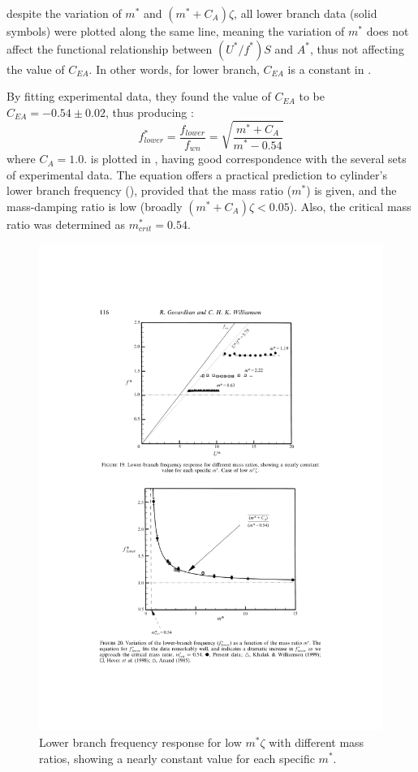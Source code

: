 despite the variation of $m^*$ and $(m^*+C_A)\zeta$, all lower branch data (solid symbols) were plotted along the same line, meaning the variation of $m^*$ does not affect the functional relationship between $(U^*/f^*)S$ and $A^*$, thus not affecting the value of $C_{EA}$. In other words, for lower branch, $C_{EA}$ is a constant in .

By fitting experimental data, they found the value of $C_{EA}$ to be $C_{EA}=-0.54\pm0.02$, thus producing :
\begin{equation}	\label{eq:61}
f^*_{lower}=\frac{f_{lower}}{f_{wn}}=\sqrt{\frac{m^*+C_A}{m^*-0.54}}
\end{equation}
where $C_A=1.0$.  is plotted in , having good correspondence with the several sets of experimental data. The equation offers a practical prediction to cylinder's lower branch frequency (\fslower{}), provided that the mass ratio ($m^*$) is given, and the mass-damping ratio is low (broadly $(m^*+C_A)\zeta < 0.05$). Also, the critical mass ratio was determined as $m^*_{crit}=0.54$.

\begin{figure}
	\centering
	\captionsetup{justification=centering}
	\includegraphics[width=0.7\linewidth]{Figs/ufstart}
	\caption{Lower branch frequency response for low $m^*\zeta$ with different mass ratios, showing a nearly constant value for each specific $m^*$.\cite{GOVARDHAN2000}}
	\label{fig:ufstart}
\end{figure}

